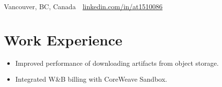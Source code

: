 \documentclass[11pt, letterpaper]{simple-cv}
\begin{document}
\centerline{
	Vancouver, BC, Canada\ \
	\href{https://www.linkedin.com/in/at1510086}{linkedin.com/in/at1510086}\ \
}
\section{Work Experience}

\begin{itemize}
	\item Improved performance of downloading artifacts from object storage.
	\item Integrated W\&B billing with CoreWeave Sandbox.
\end{itemize}
\end{document}
